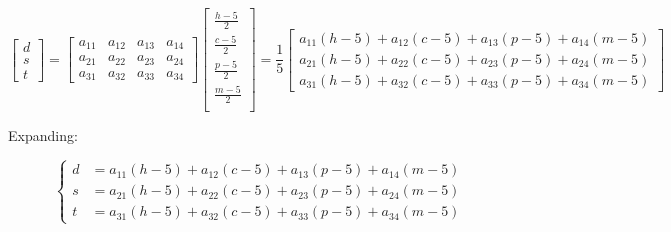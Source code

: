 \documentclass{article}
\begin{document}
        \[
            \begin{bmatrix} d \\ s \\ t \end{bmatrix}
            = 
            \begin{bmatrix} 
                a_{11} & a_{12} & a_{13} & a_{14} \\
                a_{21} & a_{22} & a_{23} & a_{24} \\
                a_{31} & a_{32} & a_{33} & a_{34}
            \end{bmatrix}
            \begin{bmatrix}
                \frac{h-5}{2} \\
                \frac{c-5}{2} \\
                \frac{p-5}{2} \\
                \frac{m-5}{2} \\
            \end{bmatrix}
            =
            \frac{1}{5}
            \begin{bmatrix}
                a_{11}(h - 5) + a_{12}(c - 5) + a_{13}(p - 5) + a_{14}(m - 5) \\
                a_{21}(h - 5) + a_{22}(c - 5) + a_{23}(p - 5) + a_{24}(m - 5) \\
                a_{31}(h - 5) + a_{32}(c - 5) + a_{33}(p - 5) + a_{34}(m - 5)
            \end{bmatrix}
        \]

        Expanding:

        \[
            \left\{
                \begin{aligned}
                    d &= a_{11}(h - 5) + a_{12}(c - 5) + a_{13}(p - 5) + a_{14}(m - 5) \\
                    s &= a_{21}(h - 5) + a_{22}(c - 5) + a_{23}(p - 5) + a_{24}(m - 5) \\
                    t &= a_{31}(h - 5) + a_{32}(c - 5) + a_{33}(p - 5) + a_{34}(m - 5)
                \end{aligned}
            \right.
        \]
\end{document}
